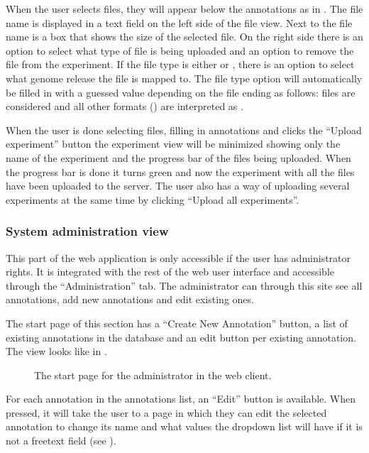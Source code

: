 When the user selects files, they will appear below the annotations as in . The file name is displayed in a text field on the left side of the file view. Next to the file name is a box that shows the size of the selected file. On the right side there is an option to select what type of file is being uploaded and an option to remove the file from the experiment. If the file type is either  or , there is an option to select what genome release the file is mapped to. The file type option will automatically be filled in with a guessed value depending on the file ending as follows:  files are considered  and all other formats () are interpreted as .

When the user is done selecting files, filling in annotations and clicks the “Upload experiment” button the experiment view will be minimized showing only the name of the experiment and the progress bar of the files being uploaded. When the progress bar is done it turns green and now the experiment with all the files have been uploaded to the server. The user also has a way of uploading several experiments at the same time by clicking “Upload all experiments”. 

\subsubsection{System administration view}

This part of the web application is only accessible if the user has administrator rights. It is integrated with the rest of the web user interface and accessible through the “Administration” tab. The administrator can through this site see all annotations, add new annotations and edit existing ones.

The start page of this section has a “Create New Annotation” button, a list of existing annotations in the database and an edit button per existing annotation. The view looks like in . 

\begin{figure}[h]
 \caption{The start page for the administrator in the web client.}
 \label{adm__web_annotationView}
\end{figure}

For each annotation in the annotations list, an “Edit” button is available. When pressed, it will take the user to a page in which they can edit the selected annotation to change its name and what values the dropdown list will have if it is not a freetext field (see ). 

